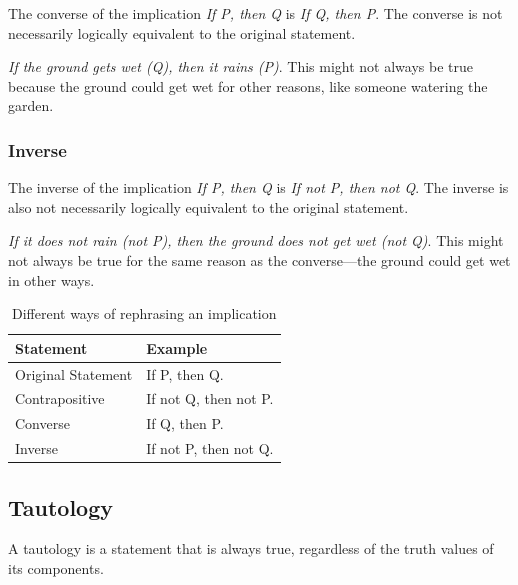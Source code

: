 \documentclass{article}
\theoremstyle{mytheoremstyle}
\theoremstyle{mytheoremstyle}
\theoremstyle{myexamplestyle}
\begin{document}
\begin{definition}
    The converse of the implication \emph{If P, then Q} is \emph{If
        Q, then P}. The converse is not necessarily logically equivalent
    to the original statement.
\end{definition}

\begin{example}
    \emph{If the ground gets wet (Q), then it rains (P)}. This might
    not always be true because the ground could get wet for other
    reasons, like someone watering the garden.
\end{example}

\newpage

\subsubsection{Inverse}

\begin{definition}
    The inverse of the implication \emph{If P, then Q} is \emph{If not P, then not Q}. The inverse is also not necessarily logically equivalent to the original statement.
\end{definition}

\begin{example}
    \emph{If it does not rain (not P), then the ground does not get wet (not Q)}. This might not always be true for the same reason as the converse—the ground could get wet in other ways.
\end{example}


\begin{table}[h!]
    \centering
    \begin{tabular}{|l|l|}
        \hline
        \textbf{Statement} & \textbf{Example}      \\\hline
        Original Statement & If P, then Q.         \\\hline
        Contrapositive     & If not Q, then not P. \\\hline
        Converse           & If Q, then P.         \\\hline
        Inverse            & If not P, then not Q. \\\hline
    \end{tabular}
    \caption{Different ways of rephrasing an implication}
\end{table}

\subsection{Tautology}
\begin{definition}
    A tautology is a statement that is always true, regardless of the
    truth values of its components.
\end{definition}
\end{document}
